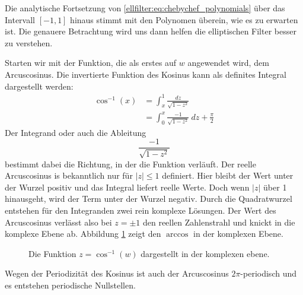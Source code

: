 Die analytische Fortsetzung von \eqref{ellfilter:eq:chebychef_polynomials} über das Intervall $[-1,1]$ hinaus stimmt mit den Polynomen überein, wie es zu erwarten ist.
Die genauere Betrachtung wird uns dann helfen die elliptischen Filter besser zu verstehen.

Starten wir mit der Funktion, die als erstes auf $w$ angewendet wird, dem Arcuscosinus.
Die invertierte Funktion des Kosinus kann als definites Integral dargestellt werden:
\begin{align}
    \cos^{-1}(x)
    &=
    \int_{x}^{1}
    \frac{
        dz
    }{
        \sqrt{
            1-z^2
        }
    }\\
    &=
    \int_{0}^{x}
    \frac{
        -1
    }{
        \sqrt{
            1-z^2
        }
    }
    ~dz
    + \frac{\pi}{2}
\end{align}
Der Integrand oder auch die Ableitung
\begin{equation}
    \frac{
        -1
    }{
        \sqrt{
            1-z^2
        }
    }
\end{equation}
bestimmt dabei die Richtung, in der die Funktion verläuft.
Der reelle Arcuscosinus is bekanntlich nur für $|z| \leq 1$ definiert.
Hier bleibt der Wert unter der Wurzel positiv und das Integral liefert reelle Werte.
Doch wenn $|z|$ über 1 hinausgeht, wird der Term unter der Wurzel negativ.
Durch die Quadratwurzel entstehen für den Integranden zwei rein komplexe Lösungen.
Der Wert des Arcuscosinus verlässt also bei $z= \pm 1$ den reellen Zahlenstrahl und knickt in die komplexe Ebene ab.
Abbildung \ref{ellfilter:fig:arccos} zeigt den $\arccos$ in der komplexen Ebene.
\begin{figure}
    \centering
    
    \caption{Die Funktion $z = \cos^{-1}(w)$ dargestellt in der komplexen ebene.}
    \label{ellfilter:fig:arccos}
\end{figure}
Wegen der Periodizität des Kosinus ist auch der Arcuscosinus $2\pi$-periodisch und es entstehen periodische Nullstellen.

